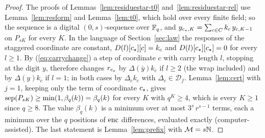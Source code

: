 \begin{proof}
The proofs of Lemmas~\ref{lem:residuestar-t0} and~\ref{lem:residuestar-rel} use Lemma~\ref{lem:resform} and Lemma~\ref{lem:t0}, which hold over every finite field; so the sequence is a digital $(0,s)$-sequence over $\mathbb{F}_q$, and $y_{c_{\star},K}=\sum_{c\in C}k_c\,y_{c,K-1}$ on $P_{sK}$ for every $K$. In the language of Section~\ref{sec:law} the responses of the staggered coordinate are constant, $D(l)[c_{\star}][c]=k_c$ and $D(l)[c_{\star}][c_{\star}]=0$ for every $l\ge1$. By (\ref{eq:carrychange}) a step of coordinate $c$ with carry length $l$, stopping at the digit $y$, therefore changes $r_{c_{\star}}$ by $\Delta(\bar y)k_c$ if $l\ge2$ (the wrap included) and by $\Delta(y)k_c$ if $l=1$; in both cases by $\Delta_ck_c$ with $\Delta_c\in\mathcal D_f$. Lemma~\ref{lem:cert} with $j=1$, keeping only the term of coordinate $c_{\star}$, gives $\operatorname{sep}(P_{sK})\ge\min(1,\beta_q(k))=\beta_q(k)$ for every $K$ with $q^K\ge4$, which is every $K\ge1$ since $q\ge8$. The value $\beta_q(k)$ is a minimum over at most $3^s\,r^{s-1}$ terms, each a minimum over the $q$ positions of $\operatorname{enc}$ differences, evaluated exactly (computer-assisted). The last statement is Lemma~\ref{lem:prefix} with $\mathcal{M}=s\mathbb{N}$.
\end{proof}

